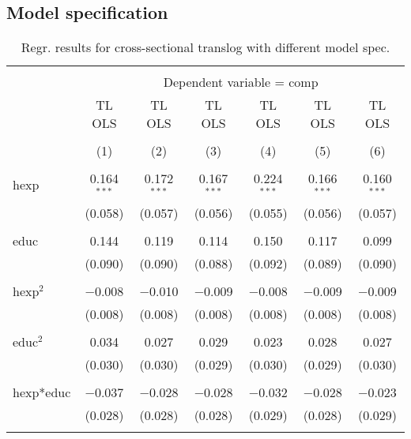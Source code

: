 \documentclass[12pt,a4paper]{article}\usepackage[]{graphicx}\usepackage[]{color}
\begin{document}
\subsection{Model specification}



\begin{table}[!htbp] \centering 
  \caption{Regr. results for cross-sectional translog with different model spec.} 
  \label{} 
\scriptsize 
\begin{tabular}{@{\extracolsep{5pt}}lcccccc} 
\\[-1.8ex]\hline 
\hline \\[-1.8ex] 
 & \multicolumn{6}{c}{Dependent variable = comp} \\ 
\cline{2-7} 
 & TL OLS & TL OLS & TL OLS & TL OLS & TL OLS & TL OLS \\ 
\\[-1.8ex] & (1) & (2) & (3) & (4) & (5) & (6)\\ 
\hline \\[-1.8ex] 
 hexp & 0.164$^{***}$ & 0.172$^{***}$ & 0.167$^{***}$ & 0.224$^{***}$ & 0.166$^{***}$ & 0.160$^{***}$ \\ 
  & (0.058) & (0.057) & (0.056) & (0.055) & (0.056) & (0.057) \\ 
  & & & & & & \\ 
 educ & 0.144 & 0.119 & 0.114 & 0.150 & 0.117 & 0.099 \\ 
  & (0.090) & (0.090) & (0.088) & (0.092) & (0.089) & (0.090) \\ 
  & & & & & & \\ 
 hexp$^2$ & $-$0.008 & $-$0.010 & $-$0.009 & $-$0.008 & $-$0.009 & $-$0.009 \\ 
  & (0.008) & (0.008) & (0.008) & (0.008) & (0.008) & (0.008) \\ 
  & & & & & & \\ 
 educ$^2$ & 0.034 & 0.027 & 0.029 & 0.023 & 0.028 & 0.027 \\ 
  & (0.030) & (0.030) & (0.029) & (0.030) & (0.029) & (0.030) \\ 
  & & & & & & \\ 
 hexp*educ & $-$0.037 & $-$0.028 & $-$0.028 & $-$0.032 & $-$0.028 & $-$0.023 \\ 
  & (0.028) & (0.028) & (0.028) & (0.029) & (0.028) & (0.029) \\ 
  & & & & & & \\ 

\end{tabular}
\end{table}
\end{document}
